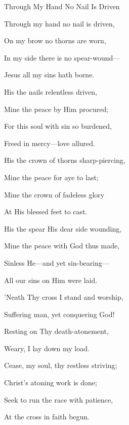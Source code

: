 \documentclass[12pt]{book}
\begin{document}
\begin{song}{Through My Hand No Nail Is Driven}{}
  {\SBPubDom}
  {}
  {}
  {}

  \begin{SBVerse}
    Through my hand no nail is driven,

    On my brow no thorns are worn,

    In my side there is no spear-wound---

    Jesus all my sins hath borne.
  \end{SBVerse}

  \begin{SBVerse}
    His the nails relentless driven,

    Mine the peace by Him procured;

    For this soul with sin so burdened,

    Freed in mercy---love allured.
  \end{SBVerse}

  \begin{SBVerse}
    His the crown of thorns sharp-piercing,

    Mine the peace for aye to last;

    Mine the crown of fadeless glory

    At His blessed feet to cast.
  \end{SBVerse}

  \begin{SBVerse}
    His the spear His dear side wounding,

    Mine the peace with God thus made,

    Sinless He---and yet sin-bearing---

    All our sins on Him were laid.
  \end{SBVerse}

  \begin{SBVerse}
    'Neath Thy cross I stand and worship,

    Suffering man, yet conquering God!

    Resting on Thy death-atonement,

    Weary, I lay down my load.
  \end{SBVerse}

  \begin{SBVerse}
    Cease, my soul, thy restless striving;

    Christ's atoning work is done;

    Seek to run the race with patience,

    At the cross in faith begun.
  \end{SBVerse}
\end{song}
\end{document}
